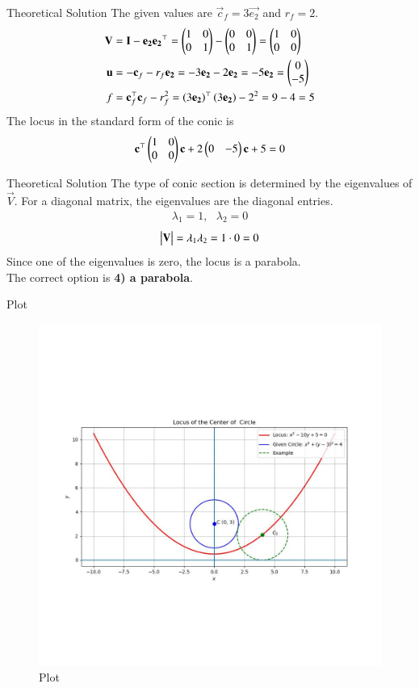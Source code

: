 \documentclass{beamer}
\begin{document}
\begin{frame}{Theoretical Solution}
The given values are $\vec{c}_f = 3\vec{e_2}$ and $r_f=2$.
\begin{align}
    \mathbf{V} &= \mathbf{I} - \mathbf{e_2}\mathbf{e_2}^\top = \begin{pmatrix}1 & 0 \\ 0 & 1\end{pmatrix} - \begin{pmatrix}0 & 0 \\ 0 & 1\end{pmatrix} = \begin{pmatrix}1 & 0 \\ 0 & 0\end{pmatrix} \\
    \mathbf{u} &= -\mathbf{c}_f - r_f\mathbf{e_2} = -3\mathbf{e_2} - 2\mathbf{e_2} = -5\mathbf{e_2} = \begin{pmatrix}0 \\ -5\end{pmatrix} \\
    f &= \mathbf{c}_f^\top\mathbf{c}_f - r_f^2 = \left(3\mathbf{e_2}\right)^\top\left(3\mathbf{e_2}\right) - 2^2 = 9 - 4 = 5
\end{align}
The locus in the standard form of the conic is
\begin{align}
    \mathbf{c}^\top\begin{pmatrix}1 & 0 \\ 0 & 0\end{pmatrix}\mathbf{c} + 2\begin{pmatrix}0 & -5\end{pmatrix}\mathbf{c} + 5 = 0
\end{align}
\end{frame}

\begin{frame}{Theoretical Solution}
The type of conic section is determined by the eigenvalues of $\vec{V}$. For a diagonal matrix, the eigenvalues are the diagonal entries.
\begin{align}
    \lambda_1 = 1, \text{ } \lambda_2 = 0
\end{align}
\begin{align}
    \begin{vmatrix}\mathbf{V}\end{vmatrix} = \lambda_1\lambda_2 = 1 \cdot 0 = 0
\end{align}
Since one of the eigenvalues is zero, the locus is a parabola. \\
The correct option is \textbf{4) a parabola}.
\end{frame}

\begin{frame}{Plot}
\begin{figure}
    \centering
    \includegraphics[width=0.5\columnwidth]{../figs/plot_c.jpg}
    \caption{Plot}
    \label{fig:fig}
\end{figure}
\end{frame}
\end{document}
